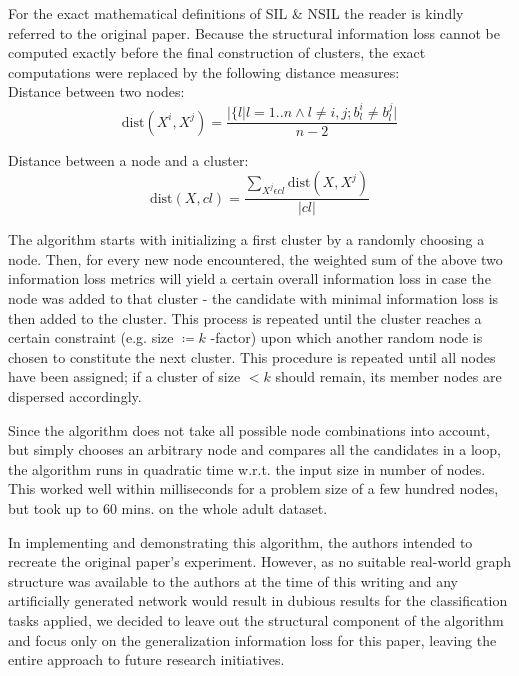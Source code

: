\documentclass{llncs}
\providecommand{\abs}[1]{\lvert#1\rvert}
\begin{document}
For the exact mathematical definitions of SIL \& NSIL the reader is kindly referred to the original paper. Because the structural information loss cannot be computed exactly before the final construction of clusters, the exact computations were replaced by the following distance measures: \\

Distance between two nodes:
\begin{equation*}
\text{dist}(X^i, X^j) = \frac{\abs{\{l|l=1..n \wedge l \ne i,j;b_l^i \ne b_l^j}}{n-2}
\end{equation*}

Distance between a node and a cluster:
\begin{equation*}
\text{dist}(X, cl) = \frac{\sum_{X^j \epsilon cl} \text{dist}(X, X^j) }{\abs{cl}}
\end{equation*}


The algorithm starts with initializing a first cluster by a randomly choosing a node. Then, for every new node encountered, the weighted sum of the above two information loss metrics will yield a certain overall information loss in case the node was added to that cluster - the candidate with minimal information loss is then added to the cluster. This process is repeated until the cluster reaches a certain constraint (e.g. size $ \coloneqq  k $ -factor) upon which another random node is chosen to constitute the next cluster. This procedure is repeated until all nodes have been assigned; if a cluster of size $< k$ should remain, its member nodes are dispersed accordingly.

Since the algorithm does not take all possible node combinations into account, but simply chooses an arbitrary node and compares all the candidates in a loop, the algorithm runs in quadratic time w.r.t. the input size in number of nodes. This worked well within milliseconds for a problem size of a few hundred nodes, but took up to 60 mins. on the whole adult dataset.

In implementing and demonstrating this algorithm, the authors intended to recreate the original paper's experiment. However, as no suitable real-world graph structure was available to the authors at the time of this writing and any artificially generated network would result in dubious results for the classification tasks applied, we decided to leave out the structural component of the algorithm and focus only on the generalization information loss for this paper, leaving the entire approach to future research initiatives.
\end{document}
